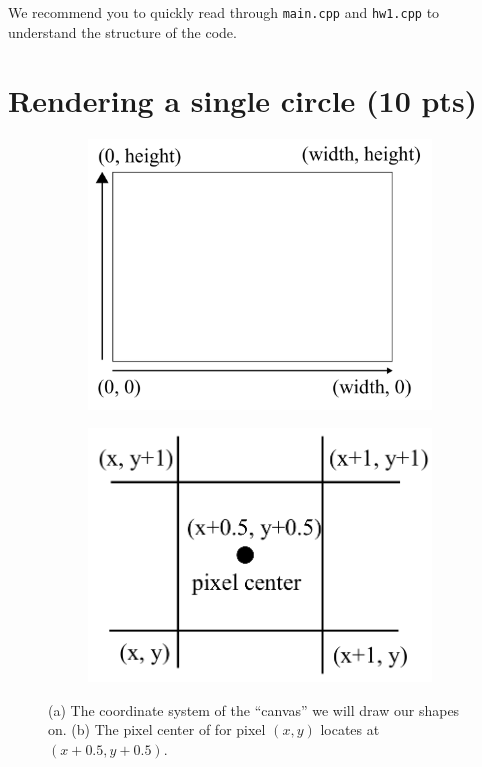 We recommend you to quickly read through \lstinline{main.cpp} and \lstinline{hw1.cpp} to understand the structure of the code.

\section{Rendering a single circle (10 pts)}

\begin{figure}[h]
    \centering
    \begin{subfigure}[t]{0.4\linewidth}
        \centering
        \includegraphics[width=\linewidth]{imgs/canvas.pdf}
        \caption{\label{fig:canvas}}
    \end{subfigure}
    \begin{subfigure}[t]{0.4\linewidth}
        \centering
        \includegraphics[width=\linewidth]{imgs/pixel.pdf}
        \caption{\label{fig:pixel}}
    \end{subfigure}
    \caption{(a) The coordinate system of the ``canvas'' we will draw our shapes on. (b) The pixel center of for pixel $(x, y)$ locates at $(x+0.5, y+0.5)$.}
\end{figure}

